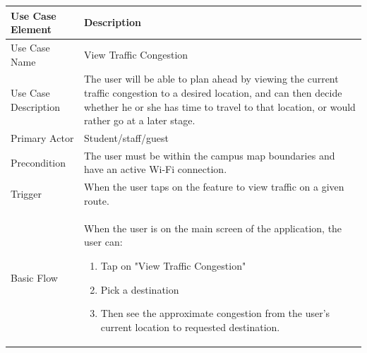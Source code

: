 \documentclass[12pt]{article}
\begin{document}
	\begin{tabular}{|p{4cm}|p{10cm}|}

\hline



Use Case Element & Description \\

\hline



Use Case Name & 

View Traffic Congestion \\

\hline



Use Case Description & 

The user will be able to plan ahead by viewing the current traffic congestion to a desired location, and can then decide whether he or she has time to travel to that location, or would rather go at a later stage.   \\

\hline



Primary Actor & 

Student/staff/guest \\

\hline



Precondition & 

The user must be within the campus map boundaries and have an active Wi-Fi connection.   \\

\hline



Trigger & 

When the user taps on the feature to view traffic on a given route.   \\

\hline



Basic Flow & 

When the user is on the main screen of the application, the user can:

\begin{enumerate}

\item Tap on "View Traffic Congestion"

\item Pick a destination

\item Then see the approximate congestion from the user's current location to requested destination.

\end{enumerate} \\

\hline



\hline

\end{tabular}
\end{document}
